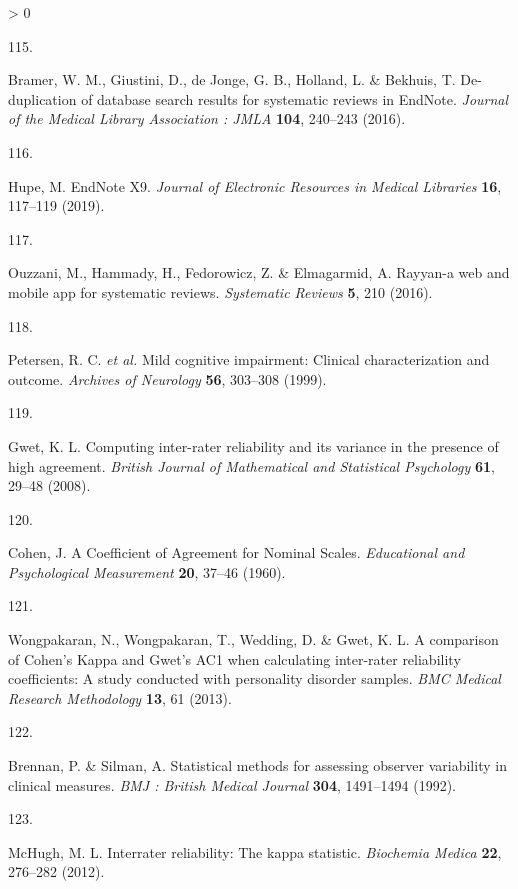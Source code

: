 \documentclass[a4paper, twoside]{templates/ociamthesis}
\newlength{\cslhangindent}
\newlength{\csllabelwidth}
\newenvironment{CSLReferences}[3] %
 {%
  \setlength{\parindent}{0pt}
  \ifodd #1 \everypar{\setlength{\hangindent}{\cslhangindent}}\ignorespaces\fi
  \ifnum #2 > 0
  \setlength{\parskip}{#2\baselineskip}
  \fi
 }%
 {}
\newcommand{\CSLLeftMargin}[1]{\parbox[t]{\maxof{\widthof{#1}}{\csllabelwidth}}{#1}}
\newcommand{\CSLRightInline}[1]{\parbox[t]{\linewidth - \csllabelwidth}{#1}}
\begin{document}
\begin{CSLReferences}{0}{0}
\leavevmode\hypertarget{ref-bramer2016}{}%
\CSLLeftMargin{115. }
\CSLRightInline{Bramer, W. M., Giustini, D., de Jonge, G. B., Holland, L. \& Bekhuis, T. De-duplication of database search results for systematic reviews in {EndNote}. \emph{Journal of the Medical Library Association : JMLA} \textbf{104}, 240--243 (2016).}

\leavevmode\hypertarget{ref-hupe2019}{}%
\CSLLeftMargin{116. }
\CSLRightInline{Hupe, M. {EndNote X9}. \emph{Journal of Electronic Resources in Medical Libraries} \textbf{16}, 117--119 (2019).}

\leavevmode\hypertarget{ref-ouzzani2016}{}%
\CSLLeftMargin{117. }
\CSLRightInline{Ouzzani, M., Hammady, H., Fedorowicz, Z. \& Elmagarmid, A. Rayyan-a web and mobile app for systematic reviews. \emph{Systematic Reviews} \textbf{5}, 210 (2016).}

\leavevmode\hypertarget{ref-petersen1999}{}%
\CSLLeftMargin{118. }
\CSLRightInline{Petersen, R. C. \emph{et al.} Mild cognitive impairment: Clinical characterization and outcome. \emph{Archives of Neurology} \textbf{56}, 303--308 (1999).}

\leavevmode\hypertarget{ref-gwet2008}{}%
\CSLLeftMargin{119. }
\CSLRightInline{Gwet, K. L. Computing inter-rater reliability and its variance in the presence of high agreement. \emph{British Journal of Mathematical and Statistical Psychology} \textbf{61}, 29--48 (2008).}

\leavevmode\hypertarget{ref-cohen1960}{}%
\CSLLeftMargin{120. }
\CSLRightInline{Cohen, J. A {Coefficient} of {Agreement} for {Nominal Scales}. \emph{Educational and Psychological Measurement} \textbf{20}, 37--46 (1960).}

\leavevmode\hypertarget{ref-wongpakaran2013}{}%
\CSLLeftMargin{121. }
\CSLRightInline{Wongpakaran, N., Wongpakaran, T., Wedding, D. \& Gwet, K. L. A comparison of {Cohen}'s {Kappa} and {Gwet}'s {AC1} when calculating inter-rater reliability coefficients: A study conducted with personality disorder samples. \emph{BMC Medical Research Methodology} \textbf{13}, 61 (2013).}

\leavevmode\hypertarget{ref-brennan1992}{}%
\CSLLeftMargin{122. }
\CSLRightInline{Brennan, P. \& Silman, A. Statistical methods for assessing observer variability in clinical measures. \emph{BMJ : British Medical Journal} \textbf{304}, 1491--1494 (1992).}

\leavevmode\hypertarget{ref-mchugh2012}{}%
\CSLLeftMargin{123. }
\CSLRightInline{McHugh, M. L. Interrater reliability: The kappa statistic. \emph{Biochemia Medica} \textbf{22}, 276--282 (2012).}


\end{CSLReferences}
\end{document}
